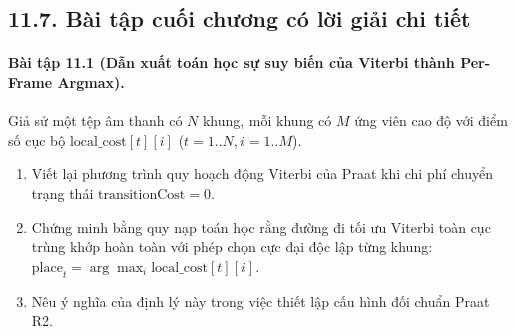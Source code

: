 \subsection*{11.7. Bài tập cuối chương có lời giải chi tiết}

\paragraph{Bài tập 11.1 (Dẫn xuất toán học sự suy biến của Viterbi thành Per-Frame Argmax).}
Giả sử một tệp âm thanh có $N$ khung, mỗi khung có $M$ ứng viên cao độ với điểm số cục bộ $\text{local\_cost}[t][i]$ ($t = 1..N, i = 1..M$).
\begin{enumerate}[label=(\alph*)]
    \item Viết lại phương trình quy hoạch động Viterbi của Praat khi chi phí chuyển trạng thái $\text{transitionCost} = 0$.
    \item Chứng minh bằng quy nạp toán học rằng đường đi tối ưu Viterbi toàn cục trùng khớp hoàn toàn với phép chọn cực đại độc lập từng khung: $\text{place}_t = \arg\max_{i} \text{local\_cost}[t][i]$.
    \item Nêu ý nghĩa của định lý này trong việc thiết lập cấu hình đối chuẩn Praat R2.
\end{enumerate}

